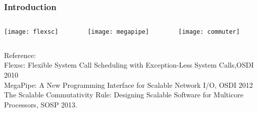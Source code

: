 %
%
\begin{frame}[plain]
	\frametitle{Introduction}
	
	
	\begin{columns}
	
	\begin{column}{.3\textwidth}	

			\texttt{[image: flexsc]}


		\end{column}

\begin{column}{.3\textwidth}
	
	\texttt{[image: megapipe]}
\end{column}



\begin{column}{.3\textwidth}	
		\texttt{[image: commuter]}
\end{column}

\end{columns}

Reference: \\
\tiny Flexsc: Flexible System Call Scheduling with Exception-Less System Calls,OSDI 2010 \\
\tiny MegaPipe: A New Programming Interface for Scalable Network I/O, OSDI 2012 \\
\tiny The Scalable Commutativity Rule: Designing Scalable Software for Multicore Processors, SOSP 2013.  


\end{frame}	


